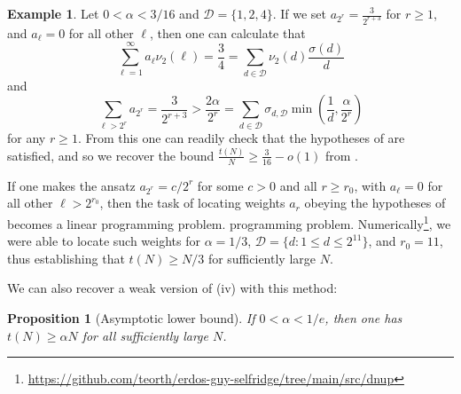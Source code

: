 \documentclass[12pt,a4paper,reqno]{amsart}
\numberwithin{equation}{section}
\theoremstyle{plain}
\newtheorem{proposition}[theorem]{Proposition}
\theoremstyle{definition}
\newtheorem{example}[theorem]{Example}
\begin{document}
\begin{example}  Let $0 < \alpha < 3/16$ and ${\mathcal D} = \{1,2,4\}$.  If we set $a_{2^r} = \frac{3}{2^{r+3}}$ for $r \geq 1$, and $a_\ell=0$ for all other $\ell$, then one can calculate that
$$ \sum_{\ell=1}^\infty a_\ell \nu_2(\ell) = \frac{3}{4} = \sum_{d \in {\mathcal D}} \nu_2(d) \frac{\sigma(d)}{d}$$
and
$$ \sum_{\ell > 2^r} a_{2^r} = \frac{3}{2^{r+3}} > \frac{2\alpha}{2^r} = \sum_{d \in {\mathcal D}} \sigma_{d,{\mathcal D}} \min\left( \frac{1}{d}, \frac{\alpha}{2^r} \right)$$
for any $r \geq 1$.  From this one can readily check that the hypotheses of  are satisfied, and so we recover the bound $\frac{t(N)}{N} \geq \frac{3}{16}-o(1)$ from \cite{guy}.
\end{example}

If one makes the ansatz $a_{2^r} = c / 2^r$ for some $c>0$ and all $r \geq r_0$, with $a_\ell = 0$ for all other $\ell > 2^{r_0}$, then the task of locating weights $a_r$ obeying the hypotheses of  becomes a linear programming problem.  
programming problem.  Numerically\footnote{\url{https://github.com/teorth/erdos-guy-selfridge/tree/main/src/dnup}}, we were able to locate such weights for $\alpha=1/3$, ${\mathcal D} = \{d: 1 \leq d \leq 2^{11}\}$, and $r_0=11$, thus establishing that $t(N) \geq N/3$ for sufficiently large $N$. 

We can also recover a weak version of (iv) with this method:

\begin{proposition}[Asymptotic lower bound]\label{asymp}  If $0 < \alpha < 1/e$, then one has $t(N) \geq \alpha N$ for all sufficiently large $N$.
\end{proposition}
\end{document}
